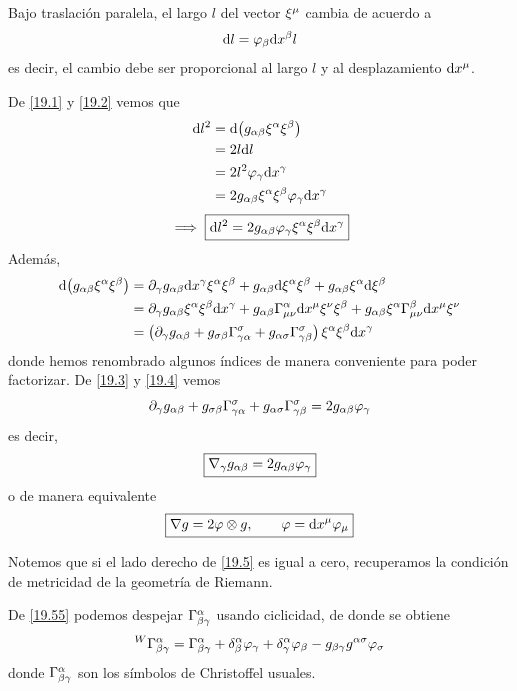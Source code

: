 Bajo traslación paralela, el largo $l$ del vector $\xi^\mu $ cambia de acuerdo a
\begin{equation}\label{19.2}
  \dd l= \varphi_\beta \dd x^\beta l
\end{equation}
es decir, el cambio debe ser proporcional al largo $l$ y al desplazamiento $\dd x^\mu $.

De \eqref{19.1} y \eqref{19.2} vemos que
\begin{align}
  \dd l^2&=\dd (g_{\alpha\beta}\xi^\alpha \xi^\beta )\\
  &=2l\dd l\\ 
  &=2l^2\varphi_\gamma \dd x^\gamma \\
  &=2 g_{\alpha\beta }\xi^\alpha \xi^\beta \varphi_\gamma \dd x^\gamma 
\end{align}
\begin{equation}\label{19.3}
\implies   \boxed{\dd l^2=2g_{\alpha\beta }\varphi_\gamma \xi^\alpha \xi^\beta \dd x^\gamma }
\end{equation}
Además,
\begin{align}
  \dd (g_{\alpha\beta}\xi^\alpha \xi^\beta )&=\partial_\gamma g_{\alpha\beta }\dd x^\gamma \xi^\alpha \xi^\beta +g_{\alpha\beta }\dd \xi^\alpha \xi^\beta +g_{\alpha\beta }\xi^\alpha \dd\xi^\beta \\
  &=\partial_\gamma g_{\alpha\beta }\xi^\alpha \xi^\beta \dd x^\gamma+g_{\alpha\beta }\Gamma^\alpha _{\mu\nu }\dd x^\mu \xi^\nu \xi^\beta +g_{\alpha\beta }\xi^\alpha \Gamma^\beta_{\mu\nu }\dd x^\mu \xi^\nu \\
  &=\left(\partial_\gamma g_{\alpha\beta }+g_{\sigma \beta }\Gamma^\sigma_{\gamma\alpha }+g_{\alpha\sigma }\Gamma^\sigma _{\gamma\beta }\right)\xi^\alpha\xi^\beta \dd x^\gamma \label{19.4}
\end{align}
donde hemos renombrado algunos índices de manera conveniente para poder factorizar. De \eqref{19.3} y \eqref{19.4} vemos
\begin{equation}\label{19.55}
  \partial_\gamma g_{\alpha\beta }+g_{\sigma \beta }\Gamma^\sigma_{\gamma\alpha }+g_{\alpha\sigma }\Gamma^\sigma _{\gamma\beta }=2g_{\alpha\beta }\varphi_\gamma 
\end{equation}
es decir,
\begin{equation}\label{19.5}
\boxed{  \nabla_\gamma g_{\alpha\beta }=2g_{\alpha\beta }\varphi_\gamma }
\end{equation}
o de manera equivalente
\begin{equation}
  \boxed{\nabla g=2 \varphi\otimes g,\qquad \varphi =\dd x^\mu \varphi_\mu }
\end{equation}

Notemos que si el lado derecho de \eqref{19.5} es igual a cero, recuperamos la condición de metricidad de la geometría de Riemann.

De \eqref{19.55} podemos despejar $\Gamma^\alpha_{\beta\gamma }$ usando ciclicidad, de donde se obtiene
\begin{equation}
  ^W\Gamma ^\alpha_{\beta\gamma }=\Gamma^\alpha _{\beta\gamma }+\delta^\alpha_\beta \varphi_\gamma +\delta^\alpha_\gamma \varphi_\beta -g_{\beta\gamma }g^{\alpha\sigma }\varphi_\sigma 
\end{equation}
donde $\Gamma^\alpha_{\beta\gamma }$ son los símbolos de Christoffel usuales.

